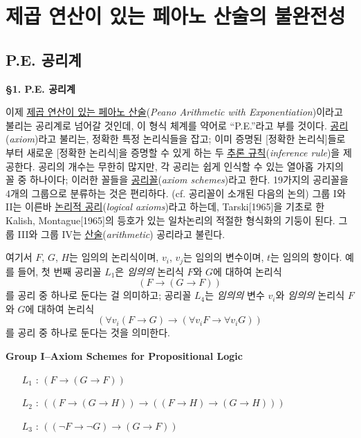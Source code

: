 \documentclass[12pt]{paper}
\begin{document}
\newpage

\section{제곱 연산이 있는 페아노 산술의 불완전성}
\hspace{12pt}

\subsection{P.E. 공리계}
\hspace{12pt}

\noindent \textbf{\S1. P.E. 공리계}

이제 \underline{제곱 연산이 있는 페아노 산술}(\textit{Peano Arithmetic with Exponentiation})이라고 불리는 공리계로 넘어갈 것인데,
이 형식 체계를 약어로 ``P.E.''라고 부를 것이다.
\underline{공리}(\textit{axiom})라고 불리는, 정확한 특정 논리식들을 잡고;
이미 증명된 [정확한 논리식]들로부터 새로운 [정확한 논리식]을 증명할 수 있게 하는 두 \underline{추론 규칙}(\textit{inference rule})을 제공한다.
공리의 개수는 무한히 많지만,
각 공리는 쉽게 인식할 수 있는 열아홉 가지의 꼴 중 하나이다;
이러한 꼴들을 \underline{공리꼴}(\textit{axiom schemes})라고 한다.
19가지의 공리꼴을 4개의 그룹으로 분류하는 것은 편리하다. (cf. 공리꼴이 소개된 다음의 논의)
그룹 I와 II는 이른바 \underline{논리적 공리}(\textit{logical axioms})라고 하는데,
Tarski[1965]을 기초로 한 Kalish, Montague[1965]의 등호가 있는 일차논리의 적절한 형식화의 기둥이 된다.
그룹 III와 그룹 IV는 \underline{산술}(\textit{arithmetic}) 공리라고 불린다.

여기서
$F$, $G$, $H$는 임의의 논리식이며,
$v_i$, $v_j$는 임의의 변수이며,
$t$는 임의의 항이다.
예를 들어, 첫 번째 공리꼴 $L_1$은 \textit{임의의} 논리식 $F$와 $G$에 대하여 논리식 $$\left( F \rightarrow \left( G \rightarrow F \right) \right)$$를 공리 중 하나로 둔다는 걸 의미하고;
공리꼴 $L_4$는 \textit{임의의} 변수 $v_i$와 \textit{임의의} 논리식 $F$와 $G$에 대하여 논리식 $$\left( \forall v_i \left( F \rightarrow G \right) \rightarrow \left( \forall v_i F \rightarrow \forall v_i G \right) \right)$$를 공리 중 하나로 둔다는 것을 의미한다.

\noindent \textbf{Group I--Axiom Schemes for Propositional Logic}
\begin{enumerate}
\item[$L_{1}$ :] $\left( F \rightarrow \left( G \rightarrow F \right) \right)$
\item[$L_{2}$ :] $\left( \left( F \rightarrow \left( G \rightarrow H \right) \right) \rightarrow \left( \left( F \rightarrow H \right) \rightarrow \left( G \rightarrow H \right) \right) \right)$
\item[$L_{3}$ :] $\left( \left( \lnot F \rightarrow \lnot G \right) \rightarrow \left( G \rightarrow F \right) \right)$
\end{enumerate}
\end{document}
